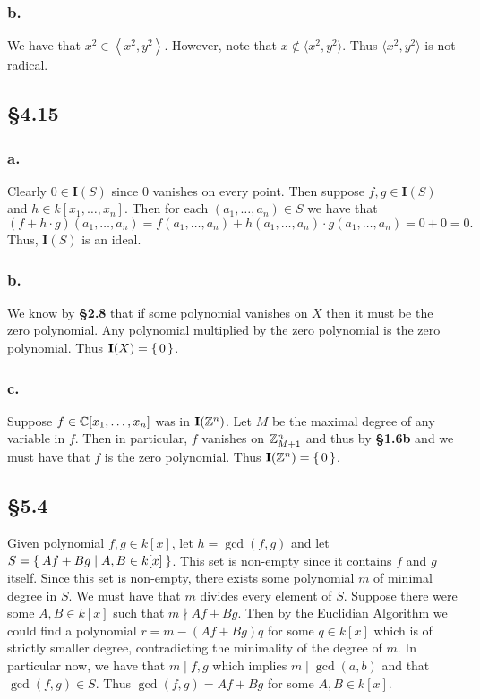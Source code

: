 \documentclass[letterpaper]{article}
\begin{document}
\subsubsection{b.}

We have that $x^{2} \in \left\langle x^{2}, y^{2} \right\rangle$. However, note that $x \notin \langle x^{2}, y^{2} \rangle$. Thus $\langle x^{2}, y^{2} \rangle$ is not radical.

\subsection{\S 4.15}

\subsubsection{a.}

Clearly $0 \in \textbf{I}(S)$ since $0$ vanishes on every point. Then suppose $f, g \in \textbf{I}(S)$ and $h \in k[x_{1},\ldots, x_{n}]$. Then for each $(a_{1}, \ldots, a_{n}) \in S$ we have that
\[
  (f + h \cdot g)(a_{1}, \ldots, a_{n}) = f(a_{1}, \ldots, a_{n}) + h(a_{1}, \ldots, a_{n}) \cdot g(a_{1}, \ldots, a_{n}) = 0 + 0 = 0.
\]
Thus, $\textbf{I}(S)$ is an ideal.

\subsubsection{b.}

We know by \textbf{\S 2.8} that if some polynomial vanishes on $X$ then it must be the zero polynomial. Any polynomial multiplied by the zero polynomial is the zero polynomial. Thus $\textbf{I}(X) = \set{0}$.

\subsubsection{c.}

Suppose $f \in \mathbb{C}[x_{1}, \ldots, x_{n}]$ was in $\textbf{I}\pqty{\Z^{n}}$. Let $M$ be the maximal degree of any variable in $f$. Then in particular, $f$ vanishes on $\mathbb{Z}_{M + 1}^{n}$ and thus by \textbf{\S 1.6b} and we must have that $f$ is the zero polynomial. Thus $\textbf{I}\pqty{\Z^{n}} = \set{0}$.

\subsection{\S 5.4}

Given polynomial $f, g \in k[x]$, let $h = \gcd(f, g)$ and let $S = \Set{Af + Bg | A, B \in k[x]}$. This set is non-empty since it contains $f$ and $g$ itself. Since this set is non-empty, there exists some polynomial $m$ of minimal degree in $S$. We must have that $m$ divides every element of $S$. Suppose there were some $A, B \in k[x]$ such that $m \nmid Af + Bg$. Then by the Euclidian Algorithm we could find a polynomial $r = m - (Af + Bg)q$ for some $q \in k[x]$ which is of strictly smaller degree, contradicting the minimality of the degree of $m$. In particular now, we have that $m \mid f, g$ which implies $m \mid \gcd(a, b)$ and that $\gcd(f, g) \in S$. Thus $\gcd(f, g) = Af + Bg$ for some $A, B \in k[x]$.
\end{document}

